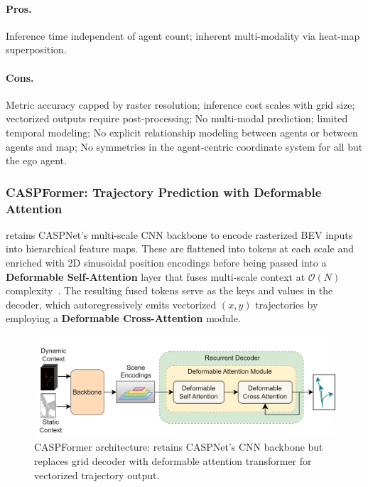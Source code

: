 \begin{description}[leftmargin=1em,itemsep=2pt]
\paragraph{Pros.} Inference time independent of agent count; inherent multi-modality via heat-map superposition.\\
\paragraph{Cons.} Metric accuracy capped by raster resolution; inference cost scales with grid size; vectorized outputs require post-processing; No multi-modal prediction; limited temporal modeling; No explicit relationship modeling between agents or between agents and map; No symmetries in the agent-centric coordinate system for all but the ego agent.

\subsubsection*{CASPFormer: Trajectory Prediction with Deformable Attention}
\label{ssec:caspformer}

retains CASPNet's multi-scale CNN backbone to encode rasterized BEV inputs into hierarchical feature maps. These are flattened into tokens at each scale and enriched with 2D sinusoidal position encodings before being passed into a \textbf{Deformable Self-Attention} layer that fuses multi-scale context at $\mathcal{O}(N)$ complexity~\cite{zhu2021deformabledetr}. The resulting fused tokens serve as the keys and values in the decoder, which autoregressively emits vectorized \((x,y)\) trajectories by employing a \textbf{Deformable Cross-Attention} module.

\begin{figure}[ht]
  \centering
  \includegraphics[width=\linewidth]{figures/caspformer-overall-arch.jpg}
  \caption{CASPFormer architecture: retains CASPNet's CNN backbone but replaces grid decoder with deformable attention transformer for vectorized trajectory output.}
  \label{fig:caspformer_overall}
\end{figure}



\end{description}
